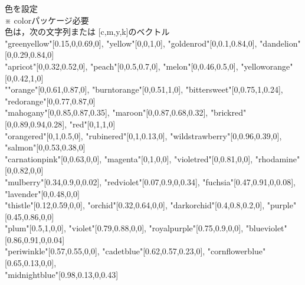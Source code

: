 \documentclass[a4j]{jarticle}
\newcommand{\tab}[2][12zw]{%
\noindent
\hspace*{2zw}\Ltab{#1 }{#2}%
}
\newcommand{\chuu}[1][15zw]{%
\Ltab{#1}{}※ %
}
\begin{document}
\tab{Setcolor(色 \{, 濃さ\})}色を設定\\
\chuu colorパッケージ必要\\
\hspace*{2zw} 色は，次の文字列または [c,m,y,k]のベクトル\\
\hspace*{2.5zw}"greenyellow"[0.15,0,0.69,0],
"yellow"[0,0,1,0],
"goldenrod"[0,0.1,0.84,0],
"dandelion"[0,0.29,0.84,0]\\
\hspace*{2.5zw}"apricot"[0,0.32,0.52,0],
"peach"[0,0.5,0.7,0],
"melon"[0,0.46,0.5,0],
"yelloworange"[0,0.42,1,0]\\
\hspace*{2.5zw}""orange"[0,0.61,0.87,0],
"burntorange"[0,0.51,1,0],
"bittersweet"[0,0.75,1,0.24],\\
\hspace*{2.5zw}"redorange"[0,0.77,0.87,0]\\
\hspace*{2.5zw}"mahogany"[0,0.85,0.87,0.35],
"maroon"[0,0.87,0.68,0.32],
"brickred"[0,0.89,0.94,0.28],
"red"[0,1,1,0]\\
\hspace*{2.5zw}"orangered"[0,1,0.5,0],
"rubinered"[0,1,0.13,0],
"wildstrawberry"[0,0.96,0.39,0],\\
\hspace*{2.5zw}"salmon"[0,0.53,0.38,0]\\
\hspace*{2.5zw}"carnationpink"[0,0.63,0,0],
"magenta"[0,1,0,0],
"violetred"[0,0.81,0,0],
"rhodamine"[0,0.82,0,0]\\
\hspace*{2.5zw}"mulberry"[0.34,0.9,0,0.02],
"redviolet"[0.07,0.9,0,0.34],
"fuchsia"[0.47,0.91,0,0.08],\\
\hspace*{2.5zw}"lavender"[0,0.48,0,0]\\
\hspace*{2.5zw}"thistle"[0.12,0.59,0,0],
"orchid"[0.32,0.64,0,0],
"darkorchid"[0.4,0.8,0.2,0],
"purple"[0.45,0.86,0,0]\\
\hspace*{2.5zw}"plum"[0.5,1,0,0],
"violet"[0.79,0.88,0,0],
"royalpurple"[0.75,0.9,0,0],
"blueviolet"[0.86,0.91,0,0.04]\\
\hspace*{2.5zw}"periwinkle"[0.57,0.55,0,0],
"cadetblue"[0.62,0.57,0.23,0],
"cornflowerblue"[0.65,0.13,0,0],\\
\hspace*{2.5zw}"midnightblue"[0.98,0.13,0,0.43]\\
\end{document}
